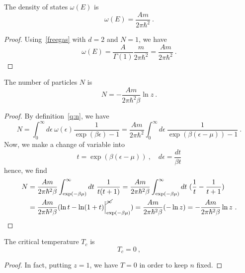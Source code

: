     The density of states $\omega(E)$ is 
    \begin{equation*}
        \omega(E) = \frac{A m}{2 \pi \hbar^2} ~.
    \end{equation*}
    \begin{proof}
        Using~\eqref{freegas} with $d = 2$ and $N=1$, we have
        \begin{equation*}
            \omega (E) = \frac{A}{\Gamma(1)} \frac{m}{2 \pi \hbar^2} = \frac{A m}{2 \pi \hbar^2} ~.
        \end{equation*}
    \end{proof}

    The number of particles $N$ is 
    \begin{equation*}
        N = -\frac{A m}{2 \pi \hbar^2 \beta} \ln z ~.
    \end{equation*}
    \begin{proof}
        By definition~\eqref{q:n}, we have 
        \begin{equation}
            N = \int_0^\infty d\epsilon ~ \omega(\epsilon) \frac{1}{\exp(\beta \epsilon) - 1} = \frac{A m}{2 \pi \hbar^2} \int_0^\infty d\epsilon ~ \frac{1}{\exp(\beta (\epsilon - \mu)) - 1} ~.
        \end{equation}
        Now, we make a change of variable into 
        \begin{equation}
            t = \exp(\beta (\epsilon - \mu)) ~, \quad d\epsilon = \frac{dt}{\beta t} 
        \end{equation}
        hence, we find 
        \begin{equation*}
        \begin{aligned}
            N & = \frac{A m}{2 \pi \hbar^2 \beta} \int_{\exp(-\beta \mu)}^\infty dt ~ \frac{1}{t (t+1)} = \frac{A m}{2 \pi \hbar^2 \beta} \int_{\exp(-\beta \mu)}^\infty dt ~ (\frac{1}{t} - \frac{1}{t+1} ) \\ & = \frac{A m}{2 \pi \hbar^2 \beta} (\ln t - \ln (1+t) \Big \vert_{\exp(-\beta \mu)}^{\cancel \infty} ) = \frac{A m}{2 \pi \hbar^2 \beta} (- \ln z) = -\frac{A m}{2 \pi \hbar^2 \beta} \ln z ~.
        \end{aligned}
    \end{equation*}
    \end{proof}

    The critical temperature $T_c$ is 
    \begin{equation*}
        T_c = 0 ~,
    \end{equation*}
    \begin{proof}
        In fact, putting $z = 1$, we have $T=0$ in order to keep $n$ fixed.
    \end{proof}

